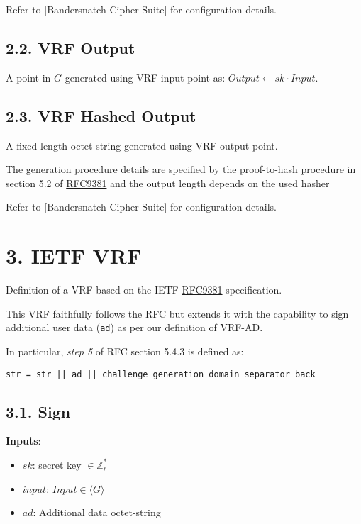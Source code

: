 \documentclass[
]{article}
\providecommand{\tightlist}{%
  \setlength{\itemsep}{0pt}\setlength{\parskip}{0pt}}
\begin{document}
Refer to {[}Bandersnatch Cipher Suite{]} for configuration details.

\hypertarget{vrf-output}{%
\subsection{2.2. VRF Output}\label{vrf-output}}

A point in \(G\) generated using VRF input point as:
\(Output \leftarrow sk \cdot Input\).

\hypertarget{vrf-hashed-output}{%
\subsection{2.3. VRF Hashed Output}\label{vrf-hashed-output}}

A fixed length octet-string generated using VRF output point.

The generation procedure details are specified by the proof-to-hash
procedure in section 5.2 of
\href{https://datatracker.ietf.org/doc/rfc9381/}{RFC9381} and the output
length depends on the used hasher

Refer to {[}Bandersnatch Cipher Suite{]} for configuration details.

\hypertarget{ietf-vrf}{%
\section{3. IETF VRF}\label{ietf-vrf}}

Definition of a VRF based on the IETF
\href{https://datatracker.ietf.org/doc/rfc9381/}{RFC9381} specification.

This VRF faithfully follows the RFC but extends it with the capability
to sign additional user data (\texttt{ad}) as per our definition of
VRF-AD.

In particular, \emph{step 5} of RFC section 5.4.3 is defined as:

\begin{verbatim}
str = str || ad || challenge_generation_domain_separator_back
\end{verbatim}

\hypertarget{sign}{%
\subsection{3.1. Sign}\label{sign}}

\textbf{Inputs}:

\begin{itemize}
\tightlist
\item
  \(sk\): secret key \(\in \mathbb{Z}^*_r\)
\item
  \(input\): \(Input \in \langle G \rangle\)
\item
  \(ad\): Additional data octet-string
\end{itemize}
\end{document}
